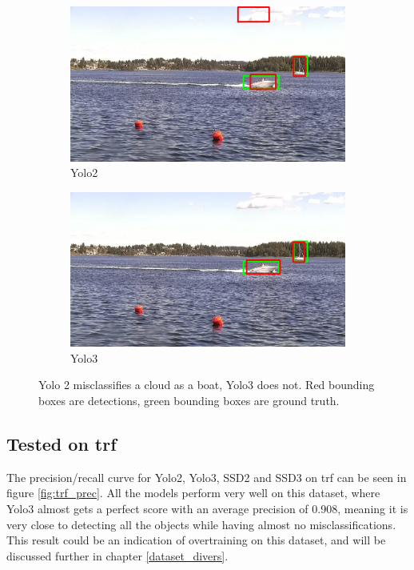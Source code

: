 \begin{figure}[h!]
\begin{subfigure}{.5\textwidth}
  \centering
  \includegraphics[width=0.9\linewidth]{results/case_buildings/yolo23/grove/yolo2/selected_06_25_frame0357.jpg}
  \caption{Yolo2}
  \label{fig:misclass_yolo2}
\end{subfigure}%
\begin{subfigure}{.5\textwidth}
  \centering
  \includegraphics[width=.9\linewidth]{results/case_buildings/yolo23/grove/yolo3/selected_06_25_frame0357.jpg}
  \caption{Yolo3}
  \label{fig:misclass_yolo3}
\end{subfigure}
\caption{Yolo 2 misclassifies a cloud as a boat, Yolo3 does not. Red bounding boxes are detections, green bounding boxes are ground truth.}
\label{img:misclass_yolo}
\end{figure}

\newpage

\subsection{Tested on trf}

The precision/recall curve for Yolo2, Yolo3, SSD2 and SSD3 on trf can be seen in figure \ref{fig:trf_prec}. All the models perform very well on this dataset, where Yolo3 almost gets a perfect score with an average precision of 0.908, meaning it is very close to detecting all the objects while having almost no misclassifications. This result could be an indication of overtraining on this dataset, and will be discussed further in chapter \ref{dataset_divers}. 

